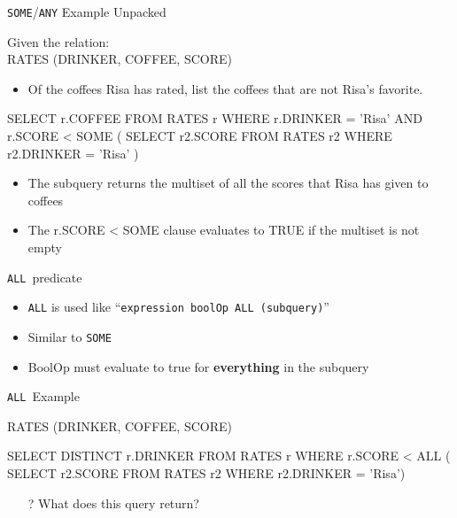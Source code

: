 \documentclass[aspectratio=169]{beamer}
\newenvironment{noindentitemize}
{ \begin{itemize}
 \setlength{\itemsep}{1.5ex}
  \setlength{\parsep}{0pt}   
  \setlength{\parskip}{0pt}
 \addtolength{\leftskip}{-2em}
 }
{ \end{itemize} }
\newcommand{\ALL}{\texttt{ALL}}
\begin{document}
\begin{frame}[fragile]{\texttt{SOME}/\texttt{ANY} Example Unpacked}

Given the relation:\\
RATES (DRINKER, COFFEE, SCORE)\\

\begin{itemize}
\item Of the coffees Risa has rated, list the coffees that are not Risa's favorite. 
\end{itemize}


\begin{SQL}
SELECT r.COFFEE
FROM RATES r
WHERE r.DRINKER = 'Risa' AND r.SCORE < SOME (
  SELECT r2.SCORE 
  FROM RATES r2
  WHERE r2.DRINKER = 'Risa' )
\end{SQL}

\begin{itemize}
\item The subquery returns the multiset of all the scores that Risa has given to coffees
\item The r.SCORE < SOME clause evaluates to TRUE if the multiset is not empty
\end{itemize}


\end{frame}


\begin{frame}[fragile]{\ALL\ predicate}


\begin{noindentitemize}
\item \texttt{ALL} is used like ``\texttt{expression boolOp ALL (subquery)}''
\item Similar to \texttt{SOME}
\item BoolOp must evaluate to true for \textbf{everything} in the subquery
\end{noindentitemize}

\end{frame}

\begin{frame}[fragile]{\ALL\ Example}

RATES (DRINKER, COFFEE, SCORE)

\begin{SQL}
SELECT DISTINCT r.DRINKER
FROM RATES r
WHERE r.SCORE < ALL (
 SELECT r2.SCORE
  FROM RATES r2
  WHERE r2.DRINKER = 'Risa')
\end{SQL}

\begin{itemize}
\item[?] What does this query return? %
\end{itemize}
\end{frame}
\end{document}
